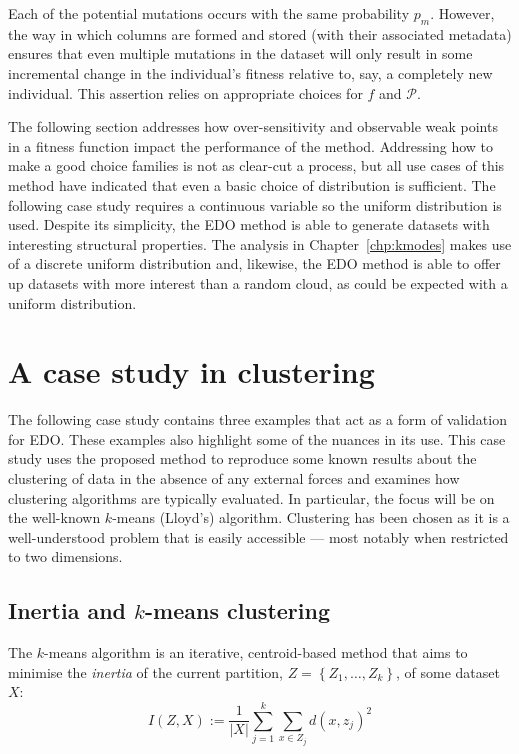 
Each of the potential mutations occurs with the same probability \(p_m\).
However, the way in which columns are formed and stored (with their associated
metadata) ensures that even multiple mutations in the dataset will only result
in some incremental change in the individual's fitness relative to, say, a
completely new individual. This assertion relies on appropriate choices for
\(f\) and \(\mathcal{P}\).

The following section addresses how over-sensitivity and observable weak points
in a fitness function impact the performance of the method. Addressing how to
make a good choice families is not as clear-cut a process, but all use cases of
this method have indicated that even a basic choice of distribution is
sufficient. The following case study requires a continuous variable so the
uniform distribution is used. Despite its simplicity, the EDO method is able to
generate datasets with interesting structural properties. The analysis in
Chapter~\ref{chp:kmodes} makes use of a discrete uniform distribution and,
likewise, the EDO method is able to offer up datasets with more interest than a
random cloud, as could be expected with a uniform distribution.



\section{A case study in clustering}\label{sec:examples}

The following case study contains three examples that act as a form of
validation for EDO. These examples also highlight some of the nuances in its
use. This case study uses the proposed method to reproduce some known results
about the clustering of data in the absence of any external forces and examines
how clustering algorithms are typically evaluated. In particular, the focus will
be on the well-known \(k\)-means (Lloyd's) algorithm. Clustering has been chosen
as it is a well-understood problem that is easily accessible --- most notably
when restricted to two dimensions.

\subsection{Inertia and \(k\)-means clustering}

The \(k\)-means algorithm is an iterative, centroid-based method that aims to
minimise the \emph{inertia} of the current partition, \(Z = \left\{Z_1, \ldots,
Z_k\right\}\), of some dataset \(X\):
\begin{equation}
    I(Z, X) := \frac{1}{|X|} \sum_{j=1}^{k} \sum_{x \in Z_j} {d(x, z_j)}^2
    \label{eq:inertia}
\end{equation}

